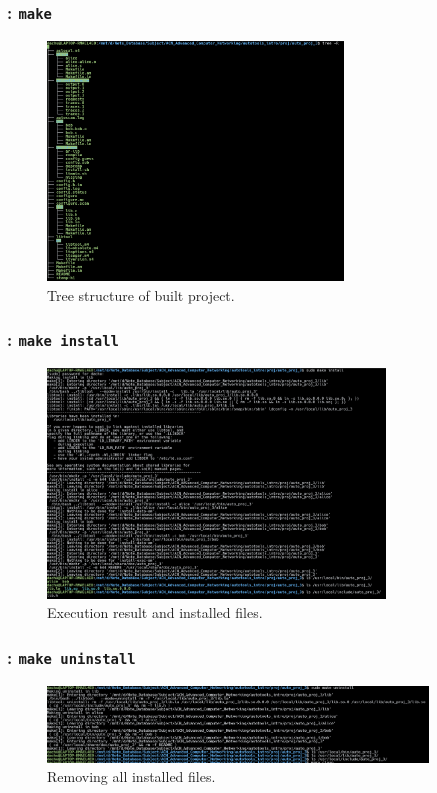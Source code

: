 \begin{frame}
    \frametitle{: \texttt{make}}

    \begin{figure}[H]
        \centering
        \includegraphics[width=0.7\textwidth]{../figure/autotool_7.png}
        \caption*{Tree structure of built project.}
    \end{figure}
\end{frame}

\begin{frame}
    \frametitle{: \texttt{make install}}

    \begin{figure}[H]
        \centering
        \includegraphics[width=0.8\textwidth]{../figure/autotool_8.png}
        \caption*{Execution result and installed files.}
    \end{figure}
\end{frame}

\begin{frame}
    \frametitle{: \texttt{make uninstall}}

    \begin{figure}[H]
        \centering
        \includegraphics[width=0.9\textwidth]{../figure/autotool_9.png}
        \caption*{Removing all installed files.}
    \end{figure}
\end{frame}

